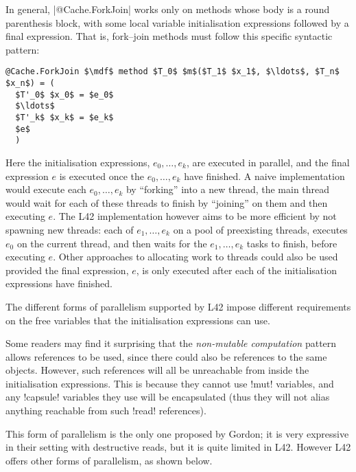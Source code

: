In general, \Q|@Cache.ForkJoin| works only on methods whose body is a round parenthesis block, with some local variable initialisation expressions followed by a final expression.
That is, fork--join methods must follow this specific syntactic pattern:
\begin{lstlisting}[deletekeywords=label]
@Cache.ForkJoin $\mdf$ method $T_0$ $m$($T_1$ $x_1$, $\ldots$, $T_n$ $x_n$) = (
  $T'_0$ $x_0$ = $e_0$
  $\ldots$
  $T'_k$ $x_k$ = $e_k$
  $e$
  )
\end{lstlisting}
Here the initialisation expressions, $e_0,\ldots,e_k$, are executed in parallel, and the final expression $e$ is executed once the $e_0,\ldots,e_k$ have finished.
A naive implementation would execute each $e_0,\ldots,e_k$ by ``forking'' into a new thread, the main thread would wait for each of these threads to finish by ``joining'' on them and then executing $e$.
The L42 implementation however aims to be more efficient by not spawning new threads: each of $e_1,\ldots,e_k$ on a pool of preexisting threads, 
executes $e_0$ on the current thread, and then waits for the $e_1,\ldots,e_k$ tasks to finish, before executing $e$.
Other approaches to allocating work to threads could also be used provided the final expression, $e$, is only executed after each of the initialisation expressions have finished.

The different forms of parallelism supported by L42 impose different requirements on the free variables that the initialisation expressions can use.

Some readers may find it surprising that the \emph{non-mutable computation} pattern allows \Q@read@ references to be used, since there could also be \Q@mut@ references to the same objects.
However, such \Q@mut@ references will all be unreachable from inside the initialisation expressions. This is because they cannot use \Q!mut! variables, and any \Q!capsule! variables they use will be encapsulated (thus they will not alias anything reachable from such \Q!read! references).

This form of parallelism is the only one proposed by Gordon; it is very expressive in their setting with destructive reads, but it is quite limited in L42. However L42 offers other forms of parallelism, as shown below.




